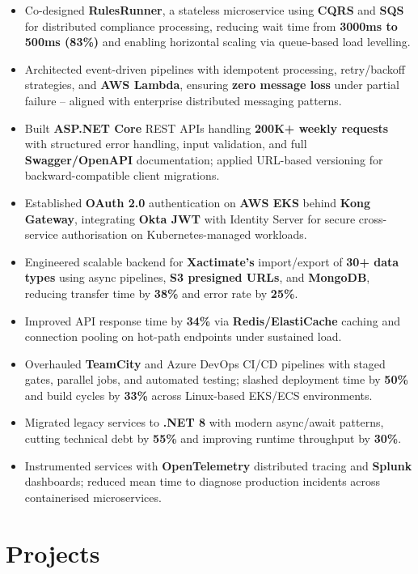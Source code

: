 \documentclass[letterpaper,10pt]{article}
\begin{document}
\begin{itemize}[leftmargin=*]
    \item Co-designed \textbf{RulesRunner}, a stateless microservice using \textbf{CQRS} and \textbf{SQS} for distributed compliance processing, reducing wait time from \textbf{3000ms to 500ms (83\%)} and enabling horizontal scaling via queue-based load levelling.
    \item Architected event-driven pipelines with idempotent processing, retry/backoff strategies, and \textbf{AWS Lambda}, ensuring \textbf{zero message loss} under partial failure -- aligned with enterprise distributed messaging patterns.
    \item Built \textbf{ASP.NET Core} REST APIs handling \textbf{200K+ weekly requests} with structured error handling, input validation, and full \textbf{Swagger/OpenAPI} documentation; applied URL-based versioning for backward-compatible client migrations.
    \item Established \textbf{OAuth 2.0} authentication on \textbf{AWS EKS} behind \textbf{Kong Gateway}, integrating \textbf{Okta JWT} with Identity Server for secure cross-service authorisation on Kubernetes-managed workloads.
    \item Engineered scalable backend for \textbf{Xactimate's} import/export of \textbf{30+ data types} using async pipelines, \textbf{S3 presigned URLs}, and \textbf{MongoDB}, reducing transfer time by \textbf{38\%} and error rate by \textbf{25\%}.
    \item Improved API response time by \textbf{34\%} via \textbf{Redis/ElastiCache} caching and connection pooling on hot-path endpoints under sustained load.
    \item Overhauled \textbf{TeamCity} and Azure DevOps CI/CD pipelines with staged gates, parallel jobs, and automated testing; slashed deployment time by \textbf{50\%} and build cycles by \textbf{33\%} across Linux-based EKS/ECS environments.
    \item Migrated legacy services to \textbf{.NET 8} with modern async/await patterns, cutting technical debt by \textbf{55\%} and improving runtime throughput by \textbf{30\%}.
    \item Instrumented services with \textbf{OpenTelemetry} distributed tracing and \textbf{Splunk} dashboards; reduced mean time to diagnose production incidents across containerised microservices.
\end{itemize}

\section*{Projects}
\end{document}
